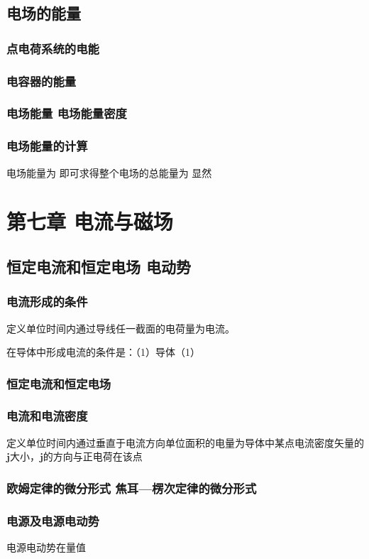 \section{电场的能量}
    \subsection{点电荷系统的电能}
    \subsection{电容器的能量}
    \subsection{电场能量 电场能量密度}
    \subsection{电场能量的计算}
    电场能量为
    即可求得整个电场的总能量为
    显然

\chapter{第七章 电流与磁场}

\section{恒定电流和恒定电场 电动势}
    \subsection{电流形成的条件}
    定义单位时间内通过导线任一截面的电荷量为电流。

    在导体中形成电流的条件是：（1）导体（1）
    \subsection{恒定电流和恒定电场}
    \subsection{电流和电流密度}
    定义单位时间内通过垂直于电流方向单位面积的电量为导体中某点电流密度矢量的$\boldsymbol{j}$大小，$\boldsymbol{j}$的方向与正电荷在该点
    \subsection{欧姆定律的微分形式 焦耳—楞次定律的微分形式}
    \subsection{电源及电源电动势}
    电源电动势在量值

